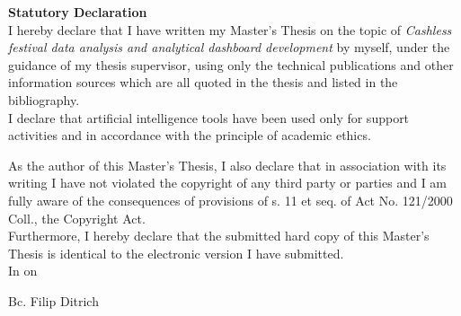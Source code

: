 \newpage
\pagestyle{empty}

\noindent
{\large\bfseries Statutory Declaration}\\

\noindent
I hereby declare that I have written my Master's Thesis on the topic of \textit{Cashless festival data analysis and analytical dashboard development} by myself, under the guidance of my thesis supervisor, using only the technical publications and other information sources which are all quoted in the thesis and listed in the bibliography.\\
I declare that artificial intelligence tools have been used only for support activities and in accordance with the principle of academic ethics.

\noindent
As the author of this Master's Thesis, I also declare that in association with its writing I have not violated the copyright of any third party or parties and I am fully aware of the consequences of provisions of s. 11 et seq. of Act No. 121/2000 Coll., the Copyright Act.\\

\noindent
Furthermore, I hereby declare that the submitted hard copy of this Master's Thesis is identical to the electronic version I have submitted.\\

\vspace{18mm}
\noindent
In \makebox[4cm]{\dotfill} on \makebox[2.5cm]{\dotfill}
\hspace*{\fill}
\makebox[4cm]{\dotfill}

\begin{flushright}
    \noindent
    Bc. Filip Ditrich
\end{flushright}
